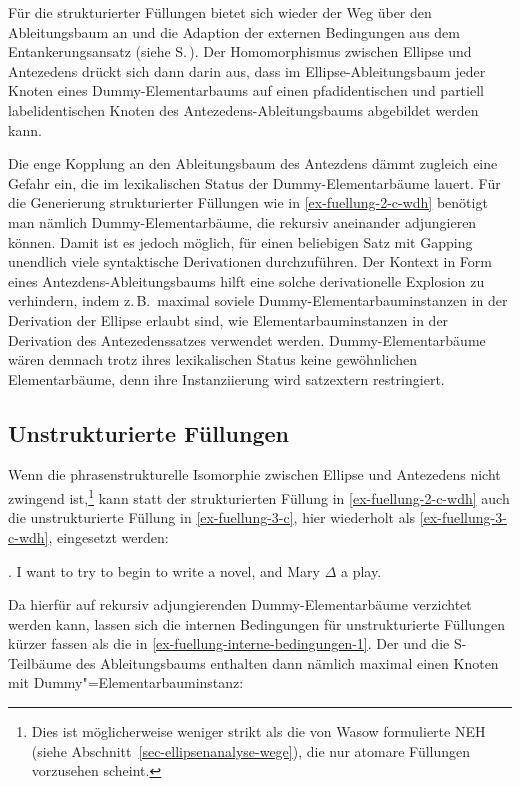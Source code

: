 Für die  strukturierter Füllungen bietet sich wieder der Weg über den Ableitungsbaum an und die Adaption der externen Bedingungen aus dem Entankerungsansatz (siehe S.\,\pageref{sec-deanchoring-extern}). Der Homomorphismus zwischen Ellipse und Antezedens drückt sich dann darin aus, dass im Ellipse-Ableitungsbaum jeder Knoten eines Dummy-Elementarbaums auf einen pfadidentischen und partiell labelidentischen Knoten des Antezedens-Ableitungsbaums abgebildet werden kann.    

Die enge Kopplung an den Ableitungsbaum des Antezdens dämmt zugleich eine Gefahr ein, die im lexikalischen Status der Dummy-Elementarbäume lauert. Für die Generierung strukturierter Füllungen wie in \ref{ex-fuellung-2-c-wdh} benötigt man nämlich Dummy-Elementarbäume, die rekursiv aneinander adjungieren können. Damit ist es jedoch möglich, für einen beliebigen Satz mit Gapping unendlich viele syntaktische Derivationen durchzuführen. Der Kontext in Form eines Antezdens-Ableitungsbaums hilft eine solche derivationelle Explosion zu verhindern, indem z.\,B.\ maximal soviele Dummy-Elementarbauminstanzen in der Derivation der Ellipse erlaubt sind, wie Elementarbauminstanzen in der Derivation des Antezedenssatzes verwendet werden. Dummy-Elementarbäume wären demnach trotz ihres lexikalischen Status keine gewöhnlichen Elementarbäume, denn ihre Instanziierung wird satzextern restringiert.

\subsection{Unstrukturierte Füllungen}

Wenn die phrasenstrukturelle Isomorphie zwischen Ellipse und Antezedens nicht zwingend ist,\footnote{Dies ist möglicherweise weniger strikt als die von Wasow formulierte NEH (siehe Abschnitt~\ref{sec-ellipsenanalyse-wege}), die nur atomare Füllungen vorzusehen scheint.} kann statt der strukturierten Füllung in \ref{ex-fuellung-2-c-wdh} auch die unstrukturierte Füllung in \ref{ex-fuellung-3-c}, hier wiederholt als \ref{ex-fuellung-3-c-wdh}, eingesetzt werden:
  
\ex. I want to try to begin to write a novel, and Mary $\Delta$ a play.\label{ex-fuellung-3-c-wdh}
  
Da hierfür auf rekursiv adjungierenden Dummy-Elementarbäume verzichtet werden kann, lassen sich die internen Bedingungen für unstrukturierte Füllungen kürzer fassen als die in \ref{ex-fuellung-interne-bedingungen-1}. Der  und die S-Teilbäume des Ableitungsbaums enthalten dann nämlich maximal einen Knoten mit Dummy"=Elementarbauminstanz:

